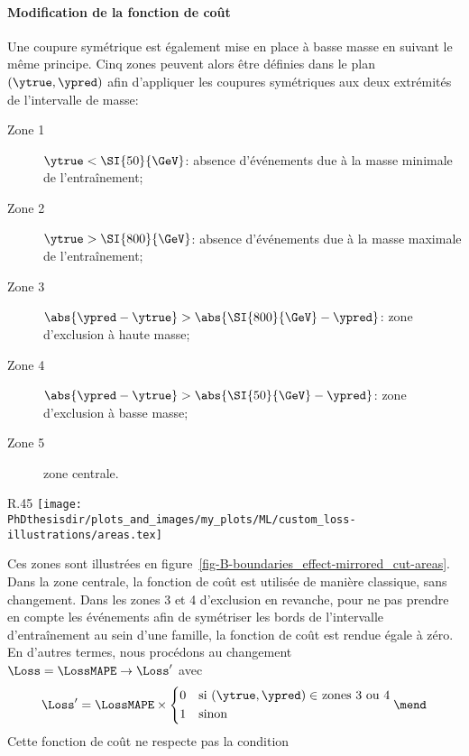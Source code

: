 \paragraph{Modification de la fonction de coût}
Une coupure symétrique est également mise en place à basse masse en suivant le même principe.
Cinq zones peuvent alors être définies dans le plan $(\ytrue, \ypred)$
afin d'appliquer les coupures symétriques aux deux extrémités de l'intervalle de masse:
\begin{description}
\item[Zone 1] $\ytrue < \SI{50}{\GeV}$:
absence d'événements due à la masse minimale de l'entraînement;
\item[Zone 2] $\ytrue > \SI{800}{\GeV}$:
absence d'événements due à la masse maximale de l'entraînement;
\item[Zone 3] $\abs{\ypred - \ytrue} > \abs{\SI{800}{\GeV} - \ypred}$:
zone d'exclusion à haute masse;
\item[Zone 4] $\abs{\ypred - \ytrue} > \abs{\SI{50}{\GeV} - \ypred}$:
zone d'exclusion à basse masse;
\item[Zone 5] zone centrale.
\end{description}
\begin{wrapfigure}{R}{.45\textwidth}
\vspace{-.5\baselineskip}
\centering
\texttt{[image: \\PhDthesisdir/plots\_and\_images/my\_plots/ML/custom\_loss-illustrations/areas.tex]}
\caption{Zones considérées pour l'entraînement.}
\label{fig-B-boundaries_effect-mirrored_cut-areas}
\end{wrapfigure}
\par\noindent
Ces zones sont illustrées en figure~\ref{fig-B-boundaries_effect-mirrored_cut-areas}.
Dans la zone centrale, la fonction de coût est utilisée de manière classique, sans changement.
Dans les zones 3 et 4 d'exclusion en revanche,
pour ne pas prendre en compte les événements afin de symétriser les bords de l'intervalle d'entraînement au sein d'une famille,
la fonction de coût est rendue égale à zéro.
En d'autres termes, nous procédons au changement
$\Loss=\LossMAPE\to\Loss'$ avec
\begin{equation}
\Loss' = \LossMAPE \times
\left\lbrace
\begin{aligned}
0 \quad & \text{si $(\ytrue, \ypred)\in$ zones 3 ou 4}\\
1 \quad & \text{sinon}
\end{aligned}
\right.
\mend
\end{equation}
Cette fonction de coût ne respecte pas la condition
